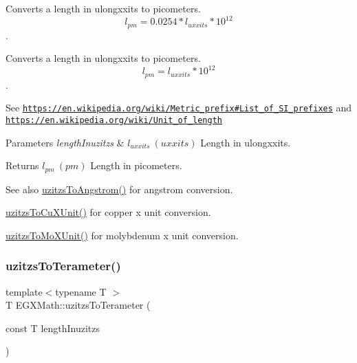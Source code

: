Converts a length in ulongxxits to picometers. \[ l_{pm}=0.0254 * l_{uxxits} * 10^{12} \]. 

Converts a length in ulongxxits to picometers. \[ l_{pm}=l_{uxxits} * 10^{12} \].

See \href{https://en.wikipedia.org/wiki/Metric_prefix#List_of_SI_prefixes}{\tt https\+://en.\+wikipedia.\+org/wiki/\+Metric\+\_\+prefix\#\+List\+\_\+of\+\_\+\+S\+I\+\_\+prefixes} and \href{https://en.wikipedia.org/wiki/Unit_of_length}{\tt https\+://en.\+wikipedia.\+org/wiki/\+Unit\+\_\+of\+\_\+length} 
\begin{DoxyParams}{Parameters}
{\em length\+Inuzitzs} & $ l_{uxxits}\ (uxxits)$ Length in ulongxxits. \\
\hline
\end{DoxyParams}
\begin{DoxyReturn}{Returns}
$ l_{pm}\ (pm)$ Length in picometers. 
\end{DoxyReturn}
\begin{DoxySeeAlso}{See also}
\mbox{\hyperlink{group___e_g_x_math-_conversions-_length_conversions-_imperial-uzitzs-_non-_s_i_gaaaecee65b1db5abcc71e18526e7073eb}{uzitzs\+To\+Angstrom()}} for angstrom conversion. 

\mbox{\hyperlink{group___e_g_x_math-_conversions-_length_conversions-_imperial-uzitzs-_non-_s_i_gab25470e41b88c41d4bf32622baa6c472}{uzitzs\+To\+Cu\+X\+Unit()}} for copper x unit conversion. 

\mbox{\hyperlink{group___e_g_x_math-_conversions-_length_conversions-_imperial-uzitzs-_non-_s_i_ga64b556911b0bb06cf315aa02f5e2d379}{uzitzs\+To\+Mo\+X\+Unit()}} for molybdenum x unit conversion. 
\end{DoxySeeAlso}
\mbox{\label{group___e_g_x_math-_conversions-_length_conversions-_imperial-uzitzs-_s_i_gaed1a457a06ea3b69a4c63414b08b03a3}} 
\subsubsection{\texorpdfstring{uzitzs\+To\+Terameter()}{uzitzsToTerameter()}}
{\footnotesize\ttfamily template$<$typename T $>$ \\
T E\+G\+X\+Math\+::uzitzs\+To\+Terameter (\begin{DoxyParamCaption}\item[{const T}]{length\+Inuzitzs }\end{DoxyParamCaption})}



